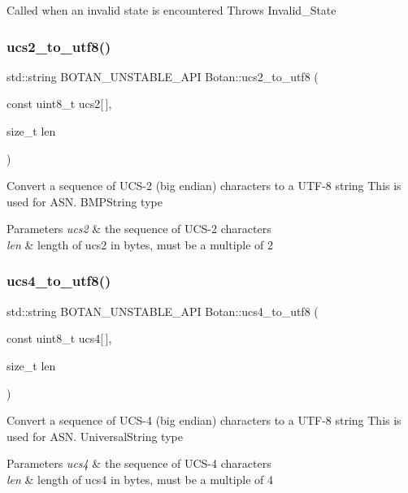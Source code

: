 Called when an invalid state is encountered Throws Invalid\+\_\+\+State \mbox{\label{namespace_botan_a2d7ee67f502279fc24a01b42c5451c3c}} 
\subsubsection{\texorpdfstring{ucs2\+\_\+to\+\_\+utf8()}{ucs2\_to\_utf8()}}
{\footnotesize\ttfamily std\+::string B\+O\+T\+A\+N\+\_\+\+U\+N\+S\+T\+A\+B\+L\+E\+\_\+\+A\+PI Botan\+::ucs2\+\_\+to\+\_\+utf8 (\begin{DoxyParamCaption}\item[{const uint8\+\_\+t}]{ucs2\mbox{[}$\,$\mbox{]},  }\item[{size\+\_\+t}]{len }\end{DoxyParamCaption})}

Convert a sequence of U\+C\+S-\/2 (big endian) characters to a U\+T\+F-\/8 string This is used for A\+S\+N. B\+M\+P\+String type 
\begin{DoxyParams}{Parameters}
{\em ucs2} & the sequence of U\+C\+S-\/2 characters \\
\hline
{\em len} & length of ucs2 in bytes, must be a multiple of 2 \\
\hline
\end{DoxyParams}
\mbox{\label{namespace_botan_a2bb4359def9a750e534e6ece252bd319}} 
\subsubsection{\texorpdfstring{ucs4\+\_\+to\+\_\+utf8()}{ucs4\_to\_utf8()}}
{\footnotesize\ttfamily std\+::string B\+O\+T\+A\+N\+\_\+\+U\+N\+S\+T\+A\+B\+L\+E\+\_\+\+A\+PI Botan\+::ucs4\+\_\+to\+\_\+utf8 (\begin{DoxyParamCaption}\item[{const uint8\+\_\+t}]{ucs4\mbox{[}$\,$\mbox{]},  }\item[{size\+\_\+t}]{len }\end{DoxyParamCaption})}

Convert a sequence of U\+C\+S-\/4 (big endian) characters to a U\+T\+F-\/8 string This is used for A\+S\+N. Universal\+String type 
\begin{DoxyParams}{Parameters}
{\em ucs4} & the sequence of U\+C\+S-\/4 characters \\
\hline
{\em len} & length of ucs4 in bytes, must be a multiple of 4 \\
\hline
\end{DoxyParams}
\mbox{\label{namespace_botan_a590c935190a5568639820d98a911f7cd}} 
